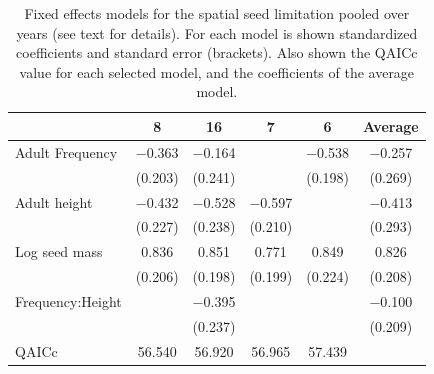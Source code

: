 \documentclass{article}
\begin{document}
%

\begin{table}
\caption{Fixed effects models for the spatial seed limitation pooled
  over years (see text for details). For each model is shown
  standardized coefficients and standard error (brackets). Also shown
  the QAICc value for each selected model, and the coefficients of the
  average model.}
\centering
\begin{tabular}[t]{lccccc}
\toprule
  & 8 & 16 & 7 & 6 & Average\\
\midrule
Adult Frequency & \num{-0.363} & \num{-0.164} &  & \num{-0.538} & \num{-0.257}\\
 & (\num{0.203}) & (\num{0.241}) &  & (\num{0.198}) & (\num{0.269})\\
Adult height & \num{-0.432} & \num{-0.528} & \num{-0.597} &  & \num{-0.413}\\
 & (\num{0.227}) & (\num{0.238}) & (\num{0.210}) &  & (\num{0.293})\\
Log seed mass & \num{0.836} & \num{0.851} & \num{0.771} & \num{0.849} & \num{0.826}\\
 & (\num{0.206}) & (\num{0.198}) & (\num{0.199}) & (\num{0.224}) & (\num{0.208})\\
Frequency:Height &  & \num{-0.395} &  &  & \num{-0.100}\\
 &  & (\num{0.237}) &  &  & (\num{0.209})\\
\midrule
QAICc & \num{56.540} & \num{56.920} & \num{56.965} & \num{57.439} & \\
\bottomrule
\end{tabular}
\label{tab:SSL_glm}
\end{table}
\end{document}
